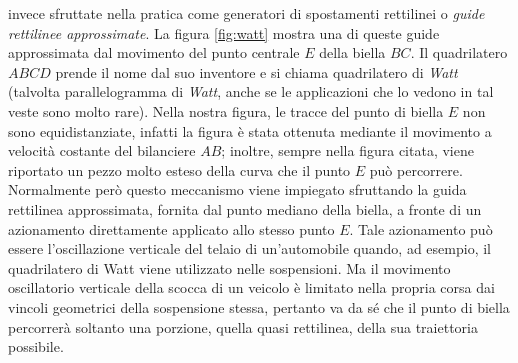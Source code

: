 invece sfruttate nella pratica come generatori di spostamenti rettilinei
o {\em guide rettilinee
approssimate}.
La figura \ref{fig:watt} mostra una di queste guide approssimata dal
movimento del
punto centrale $E$ della biella $BC$. Il quadrilatero $ABCD$ prende il nome dal suo 
inventore e si chiama quadrilatero di {\em Watt} (talvolta parallelogramma
di {\em Watt}, anche se le applicazioni che lo vedono
in tal veste sono molto rare).
Nella nostra figura, le tracce del punto di biella $E$ non sono equidistanziate,
infatti la figura \`e stata ottenuta
mediante il movimento a velocit\`a costante del bilanciere $AB$;
inoltre, sempre nella figura citata, viene riportato un pezzo
molto esteso della curva che il punto $E$ pu\`o percorrere.
Normalmente per\`o questo meccanismo viene
impiegato sfruttando la guida rettilinea approssimata, fornita dal punto mediano della 
biella, a fronte di un azionamento
direttamente applicato allo stesso punto $E$.
Tale azionamento pu\`o essere l'oscillazione verticale del telaio di un'automobile
quando, ad esempio, il quadrilatero di Watt viene utilizzato nelle sospensioni.
Ma il movimento oscillatorio verticale della scocca di un veicolo
\`e limitato nella propria corsa dai vincoli geometrici della sospensione
stessa, pertanto va da s\'e che il punto di biella percorrer\`a
soltanto una porzione, quella quasi rettilinea, della
 sua traiettoria possibile.
\newpage
\thispagestyle{empty}
\null

\endinput 
\section{Cenni Generali sulla Sintesi dei Quadrilateri}
\noindent Desideriamo concludere questo paragrafo con un brevissimo cenno
riassuntivo alle tecniche di sintesi del quadrilatero articolato.
Per prima cosa distinguiamo da subito due strade possibili: quella {\em diretta}\index{
sintesi diretta dei quadrilateri} e quella {\em indiretta}\index{sintesi
indiretta dei quadrilateri}. La prima di queste strade conduce alla determinazione,
tramite metodi grafici o analitici, dei punti di cerniera del quadrilatero
che soddisfa le richieste di
progetto in modo univoco oppure ad infinit\`a di soluzioni dipendenti da uno o 
pi\`u parametri liberi, come potrebbero essere il fattore di scala o il posizionamento
di una o pi\`u cerniere.
Il metodo indiretto consiste invece nell'analisi numerica ripetuta di diverse
soluzioni che,
guidata dall'intuito e dall'esperienza del progettista, nonch\'e dalle agili
possibilit\`a interattive dei moderni programmi di calcolo, porta via via alla
soluzione ottimale. 
\`E possibile una classificazione sistematica dei vari problemi di sintesi
che possono essere ricondotti a tre problemi paradigmatici.

